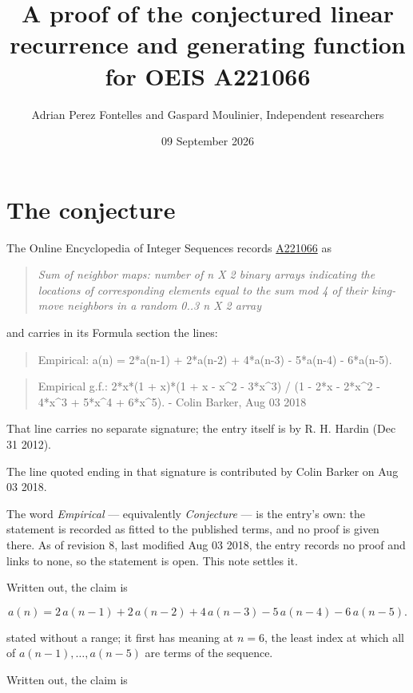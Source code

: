 \documentclass[11pt]{article}
\title{A proof of the conjectured linear recurrence and generating function for OEIS A221066}
\author{Adrian Perez Fontelles and Gaspard Moulinier, Independent researchers}
\date{09 September 2026}
\theoremstyle{definition}
\begin{document}
\maketitle
\section{The conjecture}

The Online Encyclopedia of Integer Sequences records \href{https://oeis.org/A221066}{A221066} as

\begin{quote}\itshape Sum of neighbor maps: number of n X 2 binary arrays indicating the locations of corresponding elements equal to the sum mod 4 of their king-move neighbors in a random 0..3 n X 2 array\end{quote}

and carries in its Formula section the lines:

\begin{quote}\ttfamily Empirical: a(n) = 2*a(n-1) + 2*a(n-2) + 4*a(n-3) - 5*a(n-4) - 6*a(n-5).\end{quote}

\begin{quote}\ttfamily Empirical g.f.: 2*x*(1 + x)*(1 + x - x\textasciicircum{}2 - 3*x\textasciicircum{}3) / (1 - 2*x - 2*x\textasciicircum{}2 - 4*x\textasciicircum{}3 + 5*x\textasciicircum{}4 + 6*x\textasciicircum{}5). - Colin Barker, Aug 03 2018\end{quote}

That line carries no separate signature; the entry itself is by R. H. Hardin (Dec 31 2012).

The line quoted ending in that signature is contributed by Colin Barker on Aug 03 2018.

The word {\itshape Empirical} --- equivalently {\itshape Conjecture} --- is the entry's own: the statement is recorded as fitted to the published terms, and no proof is given there. As of revision 8, last modified Aug 03 2018, the entry records no proof and links to none, so the statement is open. This note settles it.

Written out, the claim is

\[a(n) = 2\,a(n-1) + 2\,a(n-2) + 4\,a(n-3) - 5\,a(n-4) - 6\,a(n-5).\]

stated without a range; it first has meaning at $n = 6$, the least index at which all of $a(n-1),\dots,a(n-5)$ are terms of the sequence.

Written out, the claim is
\end{document}
